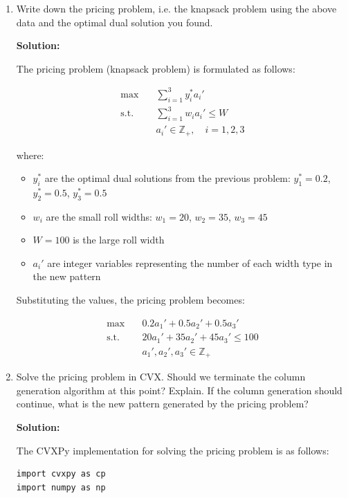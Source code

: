 \documentclass[11pt]{article}
\begin{document}
\begin{enumerate}
\begin{enumerate}
\item Write down the pricing problem, i.e. the knapsack problem using the above data and the optimal dual solution you found.

\textbf{Solution:}

The pricing problem (knapsack problem) is formulated as follows:

\begin{align*}
\max \quad & \sum_{i=1}^{3} y_i^* a_i' \\
\text{s.t.}\quad & \sum_{i=1}^{3} w_i a_i' \leq W \\
& a_i' \in \mathbb{Z}_+, \quad i = 1, 2, 3
\end{align*}

where:
\begin{itemize}
\item $y_i^*$ are the optimal dual solutions from the previous problem: $y_1^* = 0.2$, $y_2^* = 0.5$, $y_3^* = 0.5$
\item $w_i$ are the small roll widths: $w_1 = 20$, $w_2 = 35$, $w_3 = 45$
\item $W = 100$ is the large roll width
\item $a_i'$ are integer variables representing the number of each width type in the new pattern
\end{itemize}

Substituting the values, the pricing problem becomes:

\begin{align*}
\max \quad & 0.2a_1' + 0.5a_2' + 0.5a_3' \\
\text{s.t.}\quad & 20a_1' + 35a_2' + 45a_3' \leq 100 \\
& a_1', a_2', a_3' \in \mathbb{Z}_+
\end{align*} 


\item Solve the pricing problem in CVX. Should we terminate the column generation algorithm at this point? Explain. If the column generation should continue, what is the new pattern generated by the pricing problem?

\textbf{Solution:}

The CVXPy implementation for solving the pricing problem is as follows:

\begin{verbatim}
import cvxpy as cp
import numpy as np


\end{verbatim}
\end{enumerate}
\end{enumerate}
\end{document}
